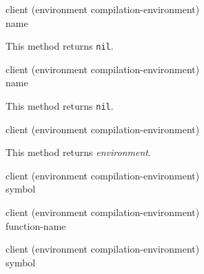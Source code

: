  {client (environment
  compilation-environment) \\ name}

This method returns \texttt{nil}.

 {client (environment
  compilation-environment) \\ name}

This method returns \texttt{nil}.

 {client (environment
  compilation-environment)}

This method returns \textit{environment}.

 {client (environment
  compilation-environment) \\ symbol}

 {client (environment
  compilation-environment) \\ function-name}

 {client (environment
  compilation-environment) \\ symbol}
